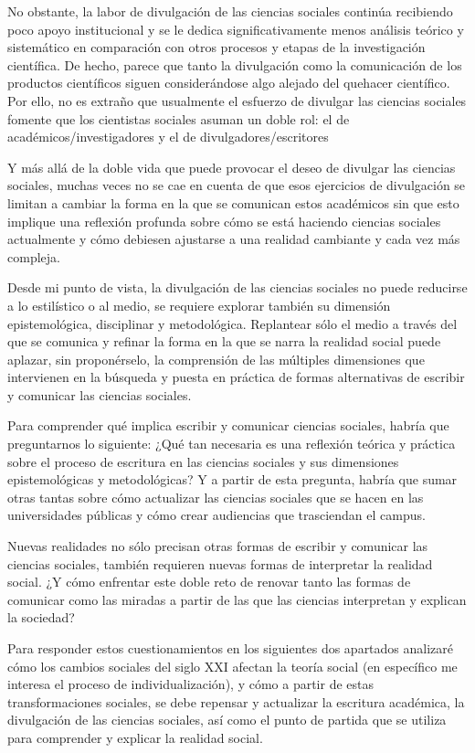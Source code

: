 \documentclass[
]{interact}
\begin{document}
No obstante, la labor de divulgación de las ciencias sociales continúa
recibiendo poco apoyo institucional y se le dedica significativamente
menos análisis teórico y sistemático en comparación con otros procesos y
etapas de la investigación científica. De hecho, parece que tanto la
divulgación como la comunicación de los productos científicos siguen
considerándose algo alejado del quehacer científico. Por ello, no es
extraño que usualmente el esfuerzo de divulgar las ciencias sociales
fomente que los cientistas sociales asuman un doble rol: el de
académicos/investigadores y el de divulgadores/escritores

Y más allá de la doble vida que puede provocar el deseo de divulgar las
ciencias sociales, muchas veces no se cae en cuenta de que esos
ejercicios de divulgación se limitan a cambiar la forma en la que se
comunican estos académicos sin que esto implique una reflexión profunda
sobre cómo se está haciendo ciencias sociales actualmente y cómo
debiesen ajustarse a una realidad cambiante y cada vez más compleja.

Desde mi punto de vista, la divulgación de las ciencias sociales no
puede reducirse a lo estilístico o al medio, se requiere explorar
también su dimensión epistemológica, disciplinar y metodológica.
Replantear sólo el medio a través del que se comunica y refinar la forma
en la que se narra la realidad social puede aplazar, sin proponérselo,
la comprensión de las múltiples dimensiones que intervienen en la
búsqueda y puesta en práctica de formas alternativas de escribir y
comunicar las ciencias sociales.

Para comprender qué implica escribir y comunicar ciencias sociales,
habría que preguntarnos lo siguiente: ¿Qué tan necesaria es una
reflexión teórica y práctica sobre el proceso de escritura en las
ciencias sociales y sus dimensiones epistemológicas y metodológicas? Y a
partir de esta pregunta, habría que sumar otras tantas sobre cómo
actualizar las ciencias sociales que se hacen en las universidades
públicas y cómo crear audiencias que trasciendan el campus.

Nuevas realidades no sólo precisan otras formas de escribir y comunicar
las ciencias sociales, también requieren nuevas formas de interpretar la
realidad social. ¿Y cómo enfrentar este doble reto de renovar tanto las
formas de comunicar como las miradas a partir de las que las ciencias
interpretan y explican la sociedad?

Para responder estos cuestionamientos en los siguientes dos apartados
analizaré cómo los cambios sociales del siglo XXI afectan la teoría
social (en específico me interesa el proceso de individualización), y
cómo a partir de estas transformaciones sociales, se debe repensar y
actualizar la escritura académica, la divulgación de las ciencias
sociales, así como el punto de partida que se utiliza para comprender y
explicar la realidad social.
\end{document}
